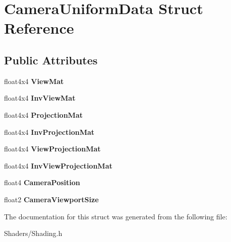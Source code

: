 \hypertarget{structCameraUniformData}{}\section{Camera\+Uniform\+Data Struct Reference}
\label{structCameraUniformData}
\subsection*{Public Attributes}
\begin{DoxyCompactItemize}
\item 
\mbox{\label{structCameraUniformData_a01514edfff9acac810fd6a65a453840b}} 
float4x4 {\bfseries View\+Mat}
\item 
\mbox{\label{structCameraUniformData_af55ae4b8ac680761b85b1204f5fcf22c}} 
float4x4 {\bfseries Inv\+View\+Mat}
\item 
\mbox{\label{structCameraUniformData_a39bbf6ea3d4020f7e3c750ac3490a4d4}} 
float4x4 {\bfseries Projection\+Mat}
\item 
\mbox{\label{structCameraUniformData_a44393ccde4c334f6b38dc571c3f80a27}} 
float4x4 {\bfseries Inv\+Projection\+Mat}
\item 
\mbox{\label{structCameraUniformData_a504182d0502dff132871c8bf137c6210}} 
float4x4 {\bfseries View\+Projection\+Mat}
\item 
\mbox{\label{structCameraUniformData_acbf3d5b25e11cbc2383d65681dd52e19}} 
float4x4 {\bfseries Inv\+View\+Projection\+Mat}
\item 
\mbox{\label{structCameraUniformData_a02e98ef42f0ec1453402e24d71950c7f}} 
float4 {\bfseries Camera\+Position}
\item 
\mbox{\label{structCameraUniformData_ace24d69a7608996740a32a51a3bb3226}} 
float2 {\bfseries Camera\+Viewport\+Size}
\end{DoxyCompactItemize}


The documentation for this struct was generated from the following file\+:\begin{DoxyCompactItemize}
\item 
Shaders/Shading.\+h\end{DoxyCompactItemize}
